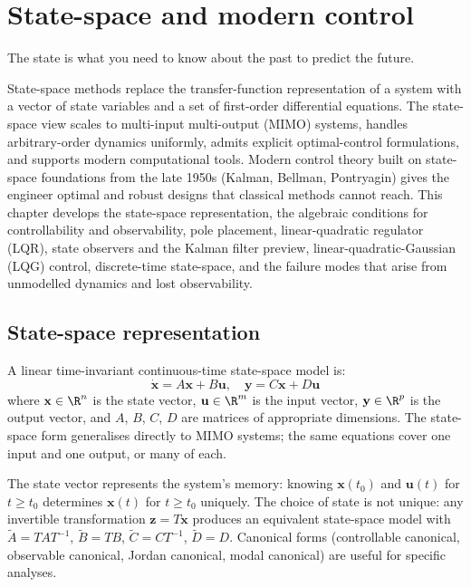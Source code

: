 \chapter{State-space and modern control}
\label{vol09:ch03}

\epigraph{The state is what you need to know about the past to predict the future.}{}


\noindent
State-space methods replace the transfer-function representation of a system with a vector of state variables and a set of first-order differential equations. The state-space view scales to multi-input multi-output (MIMO) systems, handles arbitrary-order dynamics uniformly, admits explicit optimal-control formulations, and supports modern computational tools. Modern control theory built on state-space foundations from the late 1950s (Kalman, Bellman, Pontryagin) gives the engineer optimal and robust designs that classical methods cannot reach. This chapter develops the state-space representation, the algebraic conditions for controllability and observability, pole placement, linear-quadratic regulator (LQR), state observers and the Kalman filter preview, linear-quadratic-Gaussian (LQG) control, discrete-time state-space, and the failure modes that arise from unmodelled dynamics and lost observability.

\section{State-space representation}

A linear time-invariant continuous-time state-space model is:
$$\dot{\mathbf{x}} = A \mathbf{x} + B \mathbf{u}, \quad \mathbf{y} = C \mathbf{x} + D \mathbf{u}$$
where $\mathbf{x} \in \R^n$ is the state vector, $\mathbf{u} \in \R^m$ is the input vector, $\mathbf{y} \in \R^p$ is the output vector, and $A$, $B$, $C$, $D$ are matrices of appropriate dimensions. The state-space form generalises directly to MIMO systems; the same equations cover one input and one output, or many of each.

The state vector represents the system's memory: knowing $\mathbf{x}(t_0)$ and $\mathbf{u}(t)$ for $t \geq t_0$ determines $\mathbf{x}(t)$ for $t \geq t_0$ uniquely. The choice of state is not unique: any invertible transformation $\mathbf{z} = T \mathbf{x}$ produces an equivalent state-space model with $\tilde{A} = T A T^{-1}$, $\tilde{B} = T B$, $\tilde{C} = C T^{-1}$, $\tilde{D} = D$. Canonical forms (controllable canonical, observable canonical, Jordan canonical, modal canonical) are useful for specific analyses.

